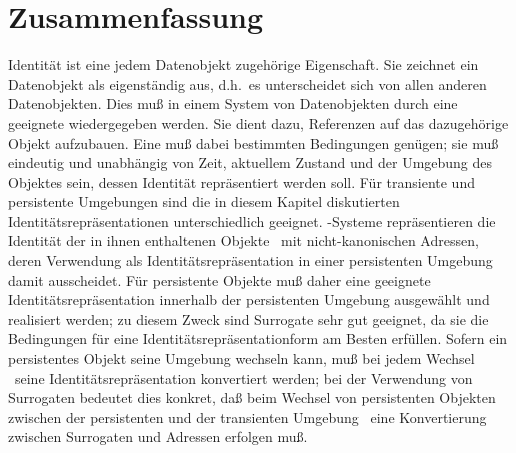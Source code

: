\section{Zusammenfassung}
%
Identit\"{a}t ist eine jedem Datenobjekt zugeh\"{o}rige Eigenschaft. Sie
zeichnet ein Datenobjekt als eigenst\"{a}ndig aus, d.h.\ es unterscheidet
sich von allen anderen Datenobjekten. Dies mu\ss{} in einem System von
Datenobjekten durch eine geeignete \representationform{} wiedergegeben
werden. Sie dient dazu, Referenzen auf das dazugeh\"{o}rige Objekt
aufzubauen. Eine \representationform{} mu\ss{} dabei bestimmten
Bedingungen gen\"{u}gen; sie mu\ss{} eindeutig und unabh\"{a}ngig von Zeit,
aktuellem Zustand und der Umgebung des Objektes sein, dessen
Identit\"{a}t repr\"{a}sentiert werden soll. F\"{u}r transiente und persistente
Umgebungen sind die in diesem Kapitel diskutierten
Iden\-ti\-t\"{a}ts\-re\-pr\"{a}\-sen\-ta\-tio\-nen unterschiedlich
geeignet. \clos-Systeme repr\"{a}sentieren die Identit\"{a}t der in ihnen
enthaltenen Objekte
\ia\ mit nicht-kanonischen Adressen, deren Verwendung als
Identit\"{a}tsrepr\"{a}sentation in einer persistenten Umgebung damit
ausscheidet.  F\"{u}r persistente Objekte mu\ss{} daher eine geeignete
Identit\"{a}tsrepr\"{a}sentation innerhalb der persistenten Umgebung
ausgew\"{a}hlt und realisiert werden; zu diesem Zweck sind Surrogate sehr
gut geeignet, da sie die Bedingungen f\"{u}r eine
Identit\"{a}tsrepr\"{a}sentationform am Besten erf\"{u}llen.  Sofern ein
persistentes Objekt seine Umgebung wechseln kann, mu\ss{}
bei jedem Wechsel \ua\ seine Identit\"{a}tsrepr\"{a}sentation konvertiert
werden; bei der Verwendung von Surrogaten bedeutet dies konkret, da\ss{}
beim Wechsel von persistenten Objekten zwischen der persistenten und
der transienten Umgebung \ua\ eine Konvertierung zwischen Surrogaten
und Adressen erfolgen mu\ss{}.
